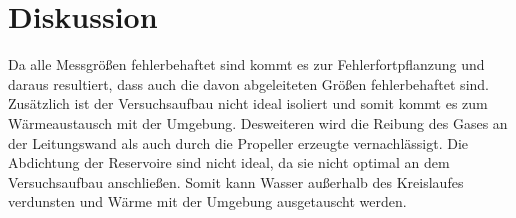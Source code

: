 \section{Diskussion}
\label{sec:Diskussion}
Da alle Messgrößen fehlerbehaftet sind kommt es zur Fehlerfortpflanzung und daraus resultiert, dass auch die davon abgeleiteten Größen fehlerbehaftet sind. Zusätzlich ist der Versuchsaufbau nicht ideal isoliert und somit kommt es zum Wärmeaustausch mit der Umgebung. Desweiteren wird die Reibung des Gases an der Leitungswand als auch durch die Propeller erzeugte vernachlässigt. Die Abdichtung der Reservoire sind nicht ideal, da sie nicht optimal an dem Versuchsaufbau anschließen. Somit kann Wasser außerhalb des Kreislaufes verdunsten und Wärme mit der Umgebung ausgetauscht werden.

